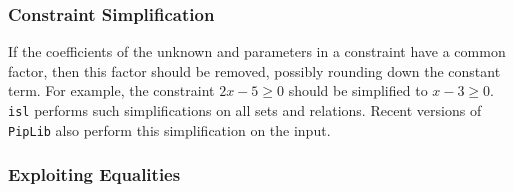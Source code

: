 \subsubsection{Constraint Simplification}

If the coefficients of the unknown and parameters in a constraint
have a common factor, then this factor should be removed, possibly
rounding down the constant term.  For example, the constraint
$2 x - 5 \ge 0$ should be simplified to $x - 3 \ge 0$.
{\tt isl} performs such simplifications on all sets and relations.
Recent versions of {\tt PipLib} also perform this simplification
on the input.

\subsubsection{Exploiting Equalities}\label{s:equalities}

